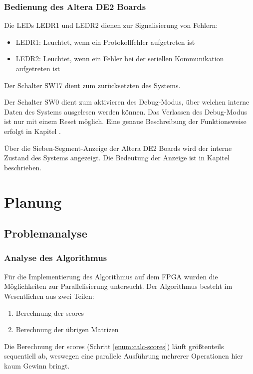 \documentclass
[ 12pt,
  parskip=half %
]{scrreprt}
\begin{document}
\subsection{Bedienung des Altera DE2 Boards}

Die LEDs LEDR1 und LEDR2 dienen zur Signalisierung von Fehlern:
\begin{itemize}
	\item LEDR1: Leuchtet, wenn ein Protokollfehler aufgetreten ist
	\item LEDR2: Leuchtet, wenn ein Fehler bei der seriellen Kommunikation aufgetreten ist
\end{itemize}

Der Schalter SW17 dient zum zurücksetzten des Systems.

Der Schalter SW0 dient zum aktivieren des Debug-Modus, über welchen interne Daten des Systems ausgelesen werden können. Das Verlassen des Debug-Modus ist nur mit einem Reset möglich. Eine genaue Beschreibung der Funktionsweise erfolgt in Kapitel .
 
Über die Sieben-Segment-Anzeige der Altera DE2 Boards wird der interne Zustand des Systems angezeigt. Die Bedeutung der Anzeige ist in Kapitel  beschrieben.

\chapter{Planung}

\section{Problemanalyse}

\subsection{Analyse des Algorithmus}

Für die Implementierung des Algorithmus auf dem FPGA wurden die Möglichkeiten zur Parallelisierung untersucht. Der Algorithmus besteht im Wesentlichen aus zwei Teilen:
\begin{enumerate}
	\item \label{enum:calc-scores} Berechnung der scores
	\item \label{enum:calc-mat} Berechnung der übrigen Matrizen
\end{enumerate} 

Die Berechnung der scores (Schritt \ref{enum:calc-scores}) läuft größtenteils sequentiell ab, weswegen eine parallele Ausführung mehrerer Operationen hier kaum Gewinn bringt.
\end{document}
